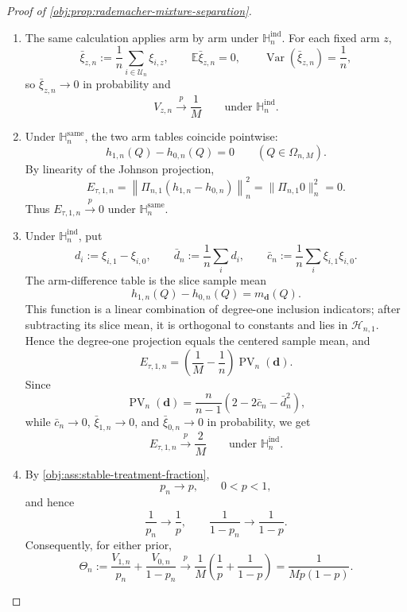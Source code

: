 \documentclass[11pt]{article}
\begin{document}
\begin{proof}[Proof of \cref{obj:prop:rademacher-mixture-separation}]
\begin{enumerate}
\item The same calculation applies arm by arm under \(\mathbb H_n^{\mathrm{ind}}\).  For each fixed arm \(z\),
\[
\bar\xi_{z,n}:=\frac1n\sum_{i\in\mathcal U_n}\xi_{i,z},
\qquad
\mathbb E\bar\xi_{z,n}=0,
\qquad
\operatorname{Var}(\bar\xi_{z,n})=\frac1n,
\]
so \(\bar\xi_{z,n}\to0\) in probability and
\[
V_{z,n}\stackrel{p}{\longrightarrow}\frac1M
\qquad
\text{under }\mathbb H_n^{\mathrm{ind}}.
\]

\item Under \(\mathbb H_n^{\mathrm{same}}\), the two arm tables coincide pointwise:
\[
h_{1,n}(Q)-h_{0,n}(Q)=0
\qquad
(Q\in\Omega_{n,M}).
\]
By linearity of the Johnson projection,
\[
E_{\tau,1,n}
=
\left\|\Pi_{n,1}(h_{1,n}-h_{0,n})\right\|_n^2
=
\|\Pi_{n,1}0\|_n^2
=
0.
\]
Thus \(E_{\tau,1,n}\stackrel{p}{\to}0\) under \(\mathbb H_n^{\mathrm{same}}\).

\item Under \(\mathbb H_n^{\mathrm{ind}}\), put
\[
d_i:=\xi_{i,1}-\xi_{i,0},
\qquad
\bar d_n:=\frac1n\sum_i d_i,
\qquad
\bar c_n:=\frac1n\sum_i \xi_{i,1}\xi_{i,0}.
\]
The arm-difference table is the slice sample mean
\[
h_{1,n}(Q)-h_{0,n}(Q)=m_{\boldsymbol d}(Q).
\]
This function is a linear combination of degree-one inclusion indicators; after subtracting its slice mean, it is orthogonal to constants and lies in \(\mathcal H_{n,1}\).  Hence the degree-one projection equals the centered sample mean, and
\[
E_{\tau,1,n}
=
\left(\frac1M-\frac1n\right)\operatorname{PV}_n(\boldsymbol d).
\]
Since
\[
\operatorname{PV}_n(\boldsymbol d)
=
\frac n{n-1}
\left(2-2\bar c_n-\bar d_n^2\right),
\]
while \(\bar c_n\to0\), \(\bar\xi_{1,n}\to0\), and \(\bar\xi_{0,n}\to0\) in probability, we get
\[
E_{\tau,1,n}\stackrel{p}{\longrightarrow}\frac2M
\qquad
\text{under }\mathbb H_n^{\mathrm{ind}}.
\]

\item By \cref{obj:ass:stable-treatment-fraction},
\[
p_n\to p,\qquad 0<p<1,
\]
and hence
\[
\frac1{p_n}\to\frac1p,
\qquad
\frac1{1-p_n}\to\frac1{1-p}.
\]
Consequently, for either prior,
\[
\Theta_n:=
\frac{V_{1,n}}{p_n}+\frac{V_{0,n}}{1-p_n}
\stackrel{p}{\longrightarrow}
\frac1M\left(\frac1p+\frac1{1-p}\right)
=
\frac1{M p(1-p)}.
\]


\end{enumerate}
\end{proof}
\end{document}
